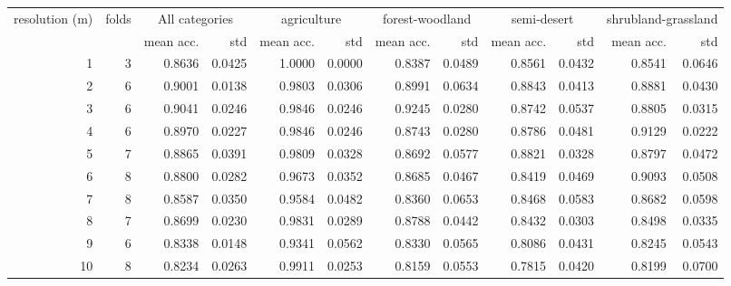 \begin{tabular}{rrrrrrrrrrrr}
\toprule
resolution (m) &  folds & \multicolumn{2}{c}{All categories} & \multicolumn{2}{c}{agriculture} & \multicolumn{2}{c}{forest-woodland} & \multicolumn{2}{c}{semi-desert} & \multicolumn{2}{c}{shrubland-grassland} \\
           &  &     mean acc. &    std &                 mean acc. &    std &                     mean acc. &    std &                 mean acc. &    std &                         mean acc. &    std \\
\midrule
         1 &     3 &   0.8636 & 0.0425 &               1.0000 & 0.0000 &                   0.8387 & 0.0489 &               0.8561 & 0.0432 &                       0.8541 & 0.0646 \\
         2 &     6 &   0.9001 & 0.0138 &               0.9803 & 0.0306 &                   0.8991 & 0.0634 &               0.8843 & 0.0413 &                       0.8881 & 0.0430 \\
         3 &     6 &   0.9041 & 0.0246 &               0.9846 & 0.0246 &                   0.9245 & 0.0280 &               0.8742 & 0.0537 &                       0.8805 & 0.0315 \\
         4 &     6 &   0.8970 & 0.0227 &               0.9846 & 0.0246 &                   0.8743 & 0.0280 &               0.8786 & 0.0481 &                       0.9129 & 0.0222 \\
         5 &     7 &   0.8865 & 0.0391 &               0.9809 & 0.0328 &                   0.8692 & 0.0577 &               0.8821 & 0.0328 &                       0.8797 & 0.0472 \\
         6 &     8 &   0.8800 & 0.0282 &               0.9673 & 0.0352 &                   0.8685 & 0.0467 &               0.8419 & 0.0469 &                       0.9093 & 0.0508 \\
         7 &     8 &   0.8587 & 0.0350 &               0.9584 & 0.0482 &                   0.8360 & 0.0653 &               0.8468 & 0.0583 &                       0.8682 & 0.0598 \\
         8 &     7 &   0.8699 & 0.0230 &               0.9831 & 0.0289 &                   0.8788 & 0.0442 &               0.8432 & 0.0303 &                       0.8498 & 0.0335 \\
         9 &     6 &   0.8338 & 0.0148 &               0.9341 & 0.0562 &                   0.8330 & 0.0565 &               0.8086 & 0.0431 &                       0.8245 & 0.0543 \\
        10 &     8 &   0.8234 & 0.0263 &               0.9911 & 0.0253 &                   0.8159 & 0.0553 &               0.7815 & 0.0420 &                       0.8199 & 0.0700 \\

\end{tabular}
